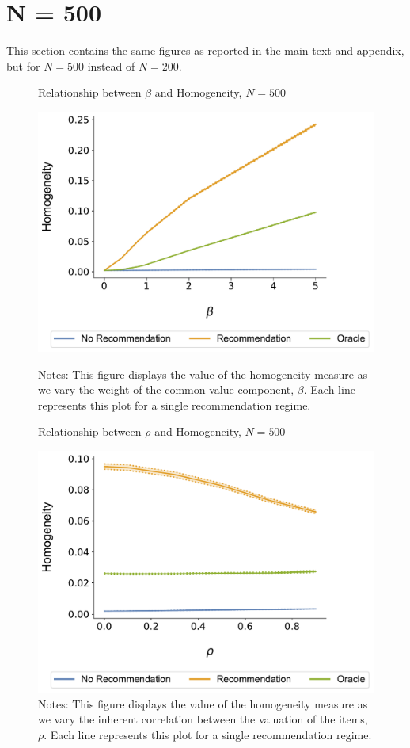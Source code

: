 \documentclass[format=acmsmall, review=true]{acmart}
\begin{document}
\section{N = 500}

This section contains the same figures as reported in the main text and appendix, but for $N = 500$ instead of $N = 200$.

\begin{figure}[ht]
\caption{Relationship between $\beta$ and Homogeneity, $N = 500$}
\includegraphics[width=.45\linewidth]{figures/beta_homogeneity_N_500_T_20}\label{fig:beta_homo}
\caption*{\scriptsize Notes: This figure displays the value of the homogeneity measure as we vary the weight of the common value component, $\beta$. Each line represents this plot for a single recommendation regime.}
\end{figure}
\begin{figure}[ht]
\caption{Relationship between $\rho$ and Homogeneity, $N = 500$}
\includegraphics[width=.45\linewidth]{figures/rho_homogeneity_N_500_T_20}
\caption*{\scriptsize Notes: This figure displays the value of the homogeneity measure as we vary the inherent correlation between the valuation of the items, $\rho$. Each line represents this plot for a single recommendation regime.}\label{fig:cor_homo}
\end{figure}
\end{document}
